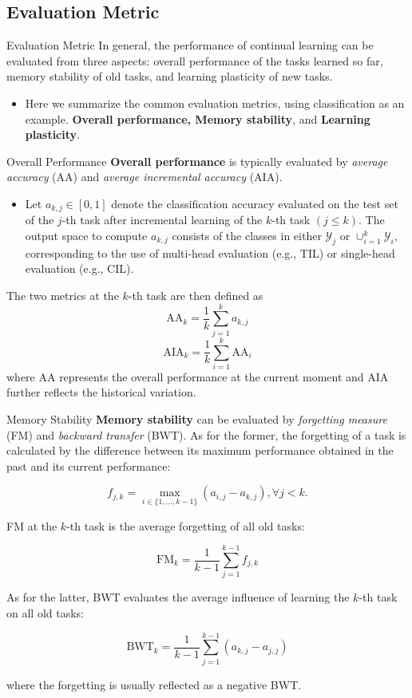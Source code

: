 \documentclass[9pt,dvipsnames]{beamer}
\begin{document}
\subsection{Evaluation Metric}
\begin{frame}{Evaluation Metric}
    In general, the performance of continual learning can be evaluated from three aspects: overall performance of the tasks learned so far, memory stability of old tasks, and learning plasticity of new tasks.
    \begin{itemize}
        \item Here we summarize the common evaluation metrics, using classification as an example. \textbf{Overall performance, Memory stability}, and \textbf{Learning plasticity}.
    \end{itemize}
\end{frame}

\begin{frame}{Overall Performance}
    \textbf{Overall performance} is typically evaluated by \textit{average accuracy} (AA) and \textit{average incremental accuracy} (AIA).
    \begin{itemize}
        \item Let $a_{k, j} \in[0,1]$ denote the classification accuracy evaluated on the test set of the $j$-th task after incremental learning of the $k$-th task $(j \leq k)$. The output space to compute $a_{k, j}$ consists of the classes in either $\mathcal{Y}_{j}$ or $\cup_{i=1}^{k} \mathcal{Y}_{i}$, corresponding to the use of multi-head evaluation (e.g., TIL) or single-head evaluation (e.g., CIL).
    \end{itemize}
    The two metrics at the $k$-th task are then defined as
    $$
        \mathrm{AA}_{k}=\frac{1}{k} \sum_{j=1}^{k} a_{k, j}
    $$
    $$
        \mathrm{AIA}_{k}=\frac{1}{k} \sum_{i=1}^{k} \mathrm{AA}_{i}
    $$
    where AA represents the overall performance at the current moment and AIA further reflects the historical variation.
\end{frame}

\begin{frame}{Memory Stability}
    \textbf{Memory stability} can be evaluated by \textit{forgetting measure} (FM) and \textit{backward transfer} (BWT). As for the former, the forgetting of a task is calculated by the difference between its maximum performance obtained in the past and its current performance:

    $$
        f_{j, k}=\max _{i \in\{1, \ldots, k-1\}}\left(a_{i, j}-a_{k, j}\right), \forall j<k .
    $$

    FM at the $k$-th task is the average forgetting of all old tasks:

    $$
        \mathrm{FM}_{k}=\frac{1}{k-1} \sum_{j=1}^{k-1} f_{j, k}
    $$

    As for the latter, BWT evaluates the average influence of learning the $k$-th task on all old tasks:

    $$
        \mathrm{BWT}_{k}=\frac{1}{k-1} \sum_{j=1}^{k-1}\left(a_{k, j}-a_{j, j}\right)
    $$

    where the forgetting is usually reflected as a negative BWT.
\end{frame}
\end{document}
